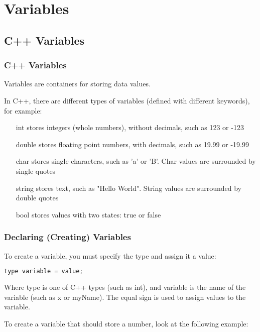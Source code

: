 \documentclass[12pt]{book}
\begin{document}
\chapter{Variables}

\section{C++ Variables}

\subsection{C++ Variables}

Variables are containers for storing data values.\newline

In C++, there are different types of variables (defined with different keywords), for example:

\begin{itemize}
	\item [int] stores integers (whole numbers), without decimals, such as 123 or -123
	\item [double] stores floating point numbers, with decimals, such as 19.99 or -19.99
	\item [char] stores single characters, such as 'a' or 'B'. Char values are surrounded by single quotes
	\item [string] stores text, such as "Hello World". String values are surrounded by double quotes
	\item [bool] stores values with two states: true or false
\end{itemize}




\subsection{Declaring (Creating) Variables}

To create a variable, you must specify the type and assign it a value:

\lstset{style=mystyle}
\begin{lstlisting}[language=C++, caption=C++ example]
type variable = value;
\end{lstlisting}


Where type is one of C++ types (such as int), and variable is the name of the variable (such as x or myName). The equal sign is used to assign values to the variable.

To create a variable that should store a number, look at the following example:
\end{document}
